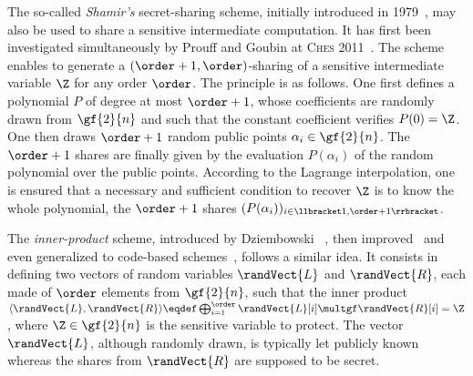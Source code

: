 The so-called \emph{Shamir's} secret-sharing scheme, initially introduced in 1979~\cite{shamir_how_1979}, may also be used to share a sensitive intermediate computation.
It has first been investigated simultaneously by Prouff \etal{} and Goubin \etal{} at \textsc{Ches} 2011~\cite{prouff_higher_2011,goubin_shamir_2011}.
The scheme enables to generate a \((\order+1, \order)\)-sharing of a sensitive intermediate variable \(\Z\) for any order \(\order\).
The principle is as follows.
One first defines a polynomial \(P\) of degree at most \(\order+1\), whose coefficients are randomly drawn from \(\gf{2}{n}\) and such that the constant coefficient verifies \(P(0) = \Z\).
One then draws \(\order+1\) random public points \(\alpha_i \in \gf{2}{n}\).
The \(\order+1\) shares are finally given by the evaluation \(P(\alpha_i)\) of the random polynomial over the public points.
According to the Lagrange interpolation, one is ensured that a necessary and sufficient condition to recover \(\Z\) is to know the whole polynomial, \ie{} the \(\order+1\) shares \((P(\alpha_i))_{i \in \llbracket 1, \order+1 \rrbracket}\).


The \emph{inner-product} scheme, introduced by Dziembowski \etal{}~\cite{dziembowski_leakage_2012,goldwasser_howto_2015}, then improved~\cite{balash_consolidating_2017} and even generalized to code-based schemes~\cite{wang_efficient_2020,guilley_optimizing_2020}, follows a similar idea.
It consists in defining two vectors of random variables \(\randVect{L}\) and \(\randVect{R}\), each made of \(\order\) elements from \(\gf{2}{n}\), such that the inner product \(\langle \randVect{L}, \randVect{R} \rangle \eqdef \bigoplus_{i=1}^\order \randVect{L}[i] \multgf \randVect{R}[i] = \Z\), where \(\Z \in \gf{2}{n}\) is the sensitive variable to protect.
The vector \(\randVect{L}\), although randomly drawn, is typically let publicly known whereas the shares from \(\randVect{R}\) are supposed to be secret.


